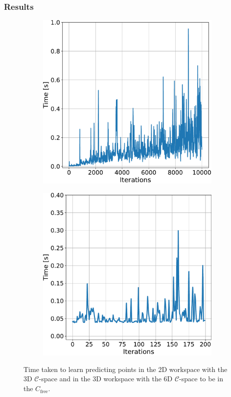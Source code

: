 \documentclass{beamer}
\begin{document}
\begin{frame}
	\frametitle{Results}	
	\begin{figure}[!ht]
		\centering  
		\begin{subfigure}[t]{0.49\textwidth}
			\includegraphics[width=\textwidth]{figChap5/graph_E_2D_learning_time.pdf}    
		  \end{subfigure} 
		  \begin{subfigure}[t]{0.49\textwidth}
			\includegraphics[width=\textwidth]{figChap5/graph_6D_learning.pdf}    
		  \end{subfigure}   
		\caption{Time taken to learn predicting points  
		in the 2D workspace with the 3D $\mathcal{C}$-space
		and in the 3D workspace with the 6D $\mathcal{C}$-space 
		to be in the \(C_{\text{free}}\).} 
	  \end{figure}
\end{frame}	
\end{document}
